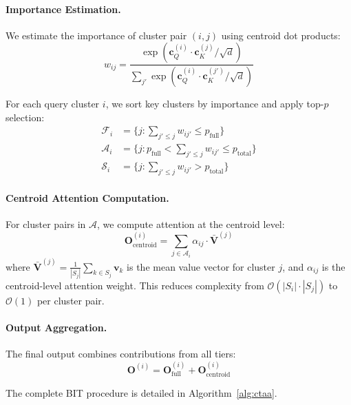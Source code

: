 \paragraph{Importance Estimation.}
We estimate the importance of cluster pair $(i, j)$ using centroid dot products:
\begin{equation}
    w_{ij} = \frac{\exp(\mathbf{c}_Q^{(i)} \cdot \mathbf{c}_K^{(j)} / \sqrt{d})}{\sum_{j'} \exp(\mathbf{c}_Q^{(i)} \cdot \mathbf{c}_K^{(j')} / \sqrt{d})}
\end{equation}

For each query cluster $i$, we sort key clusters by importance and apply top-$p$ selection:
\begin{align}
    \mathcal{F}_i &= \{j : \sum_{j' \leq j} w_{ij'} \leq p_{\text{full}}\} \\
    \mathcal{A}_i &= \{j : p_{\text{full}} < \sum_{j' \leq j} w_{ij'} \leq p_{\text{total}}\} \\
    \mathcal{S}_i &= \{j : \sum_{j' \leq j} w_{ij'} > p_{\text{total}}\}
\end{align}

\paragraph{Centroid Attention Computation.}
For cluster pairs in $\mathcal{A}$, we compute attention at the centroid level:
\begin{equation}
    \mathbf{O}_{\text{centroid}}^{(i)} = \sum_{j \in \mathcal{A}_i} \alpha_{ij} \cdot \bar{\mathbf{V}}^{(j)}
\end{equation}
where $\bar{\mathbf{V}}^{(j)} = \frac{1}{|S_j|}\sum_{k \in S_j} \mathbf{v}_k$ is the mean value vector for cluster $j$, and $\alpha_{ij}$ is the centroid-level attention weight. This reduces complexity from $\mathcal{O}(|S_i| \cdot |S_j|)$ to $\mathcal{O}(1)$ per cluster pair.

\paragraph{Output Aggregation.}
The final output combines contributions from all tiers:
\begin{equation}
    \mathbf{O}^{(i)} = \mathbf{O}_{\text{full}}^{(i)} + \mathbf{O}_{\text{centroid}}^{(i)}
\end{equation}

The complete BIT procedure is detailed in Algorithm~\ref{alg:ctaa}.

